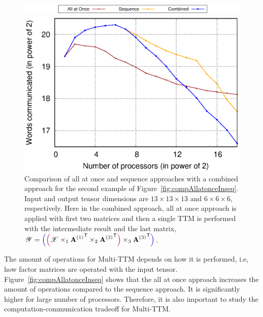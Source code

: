 \documentclass[a4paper,11pt]{article}
\newcommand{\X}{\T{X}}
\newcommand{\Y}{\T{Y}}
\newcommand{\allatoncecolor}{\color{purple}}
\newcommand{\seqcolor}{\color{blue}}
\newcommand{\allatoncestart}{{\allatoncecolor\Big(}}
\newcommand{\allatonceend}{{\allatoncecolor\Big)}}
\newcommand{\seqstart}{{\seqcolor\Big(}}
\newcommand{\seqend}{{\seqcolor\Big)}}
\begin{document}
\begin{figure}[htb]
	\begin{center}
		\includegraphics[scale=0.12]{./plots/all-at-once-seq-combined-label.png}
	\end{center}
	\vspace*{-1cm}\begin{center}
		\includegraphics[width=0.45\linewidth]{./plots/AAO-vs-Seq-logscale-comparison-with-coup.eps}
		\vspace*{-0.15cm}\caption{Comparison of all at once and sequence approaches with a combined approach for the second example of Figure~\ref{fig:compAllatonceInseq}. Input and output tensor dimensions are $13\times13\times13$ and $6\times6\times6$, respectively. Here in the combined approach,  all at once approach is applied with first two matrices and then a single TTM is performed with the intermediate  result and the last matrix, $\Y = \seqstart\allatoncestart\X \times_1 {\Mn{A}{1}}^\Tra \times_2 {\Mn{A}{2}}^\Tra\allatonceend \times_3 {\Mn{A}{3}}^\Tra\seqend$. \label{fig:compCombinedAllatonceseq}\vspace*{-0.45cm}}
	\end{center}		
\end{figure}
	

	
	
	
	The amount of operations for Multi-TTM depends on how it is performed, i.e, how factor matrices are operated with the input tensor. Figure~\ref{fig:compAllatonceInseq} shows that the all at once approach increases the amount of operations compared to the sequence approach. It is significantly higher for large number of processors. Therefore, it is also important to study the computation-communication tradeoff for Multi-TTM. 
	
	
	
\end{document}
